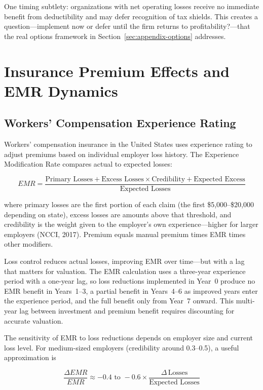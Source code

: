 \documentclass[11pt,openany]{book}
\begin{document}
One timing subtlety: organizations with net operating losses receive no
immediate benefit from deductibility and may defer recognition of tax shields.
This creates a question---implement now or defer until the firm returns to
profitability?---that the real options framework in
Section~\ref{sec:appendix-options} addresses.

\section{Insurance Premium Effects and EMR Dynamics}
\label{sec:appendix-emr}

\subsection{Workers' Compensation Experience Rating}

Workers' compensation insurance in the United States uses experience rating to
adjust premiums based on individual employer loss history. The Experience
Modification Rate compares actual to expected losses:

\[
EMR = \frac{\text{Primary Losses} + \text{Excess Losses} \times
  \text{Credibility} + \text{Expected Excess}}{\text{Expected Losses}}
\]

where primary losses are the first portion of each claim (the first
\$5{,}000--\$20{,}000 depending on state), excess losses are amounts above
that threshold, and credibility is the weight given to the employer's own
experience---higher for larger employers (NCCI, 2017). Premium equals manual
premium times EMR times other modifiers.

Loss control reduces actual losses, improving EMR over time---but with a lag
that matters for valuation. The EMR calculation uses a three-year experience
period with a one-year lag, so loss reductions implemented in Year~0 produce
no EMR benefit in Years~1--3, a partial benefit in Years~4--6 as improved
years enter the experience period, and the full benefit only from Year~7
onward. This multi-year lag between investment and premium benefit requires
discounting for accurate valuation.

The sensitivity of EMR to loss reductions depends on employer size and current
loss level. For medium-sized employers (credibility around 0.3--0.5), a useful
approximation is

\[
\frac{\Delta EMR}{EMR} \approx -0.4 \text{ to } -0.6 \times
\frac{\Delta\,\text{Losses}}{\text{Expected Losses}}
\]
\end{document}
